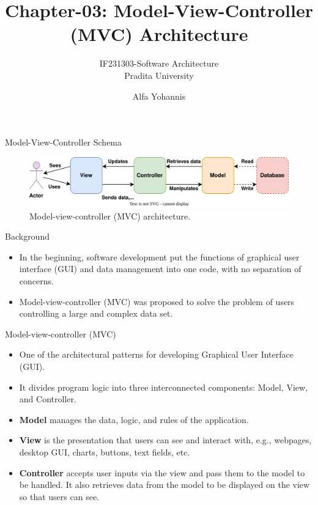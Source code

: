 \documentclass[aspectratio=169, table]{beamer}
\title{Chapter-03: Model-View-Controller (MVC) Architecture}
\subtitle{IF231303-Software Architecture\\Pradita University}
\author{Alfa Yohannis}
\begin{document}
	
	\begin{frame}[plain]
		\maketitle
	\end{frame}
	
	\begin{frame}{Model-View-Controller Schema}
		\begin{figure}[h]
			\centering
			\includegraphics[width=\textwidth]{mvc}
			\caption{Model-view-controller (MVC) architecture.}
			\label{fig:mvc}
		\end{figure}
	\end{frame}
	
	\begin{frame}{Background}
		\begin{itemize}
			\item In the beginning, software development put the functions of graphical user interface (GUI) and data management into one code, with no separation of concerns.
			\item Model-view-controller (MVC) was proposed to solve the problem of users controlling a large and complex data set.
		\end{itemize}
	\end{frame}
	
	\begin{frame}{Model-view-controller (MVC)}
		\begin{itemize}
			\item One of the architectural patterns for developing Graphical User Interface (GUI).
			\item It divides program logic into three interconnected components: Model, View, and Controller.
			\item \textbf{Model} manages the data, logic, and rules of the application.
			\item \textbf{View} is the presentation that users can see and interact with, e.g., webpages, desktop GUI, charts, buttons, text fields, etc.
			\item \textbf{Controller} accepts user inputs via the view and pass them to the model to be handled. It also retrieves data from the model to be displayed on the view so that users can see.
			
		\end{itemize}
	\end{frame}
	
\end{document}

